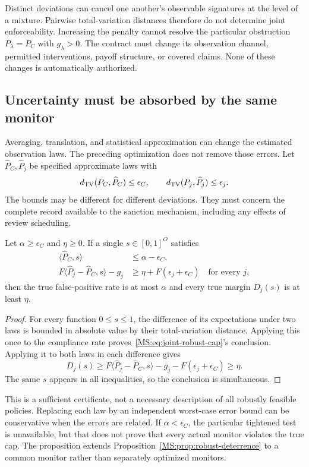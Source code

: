 Distinct deviations can cancel one another's observable signatures at the level of a mixture. Pairwise total-variation distances therefore do not determine joint enforceability. Increasing the penalty cannot resolve the particular obstruction $P_\lambda=P_C$ with $g_\lambda>0$. The contract must change its observation channel, permitted interventions, payoff structure, or covered claims. None of these changes is automatically authorized.

\subsection{Uncertainty must be absorbed by the same monitor}
Averaging, translation, and statistical approximation can change the estimated observation laws. The preceding optimization does not remove those errors. Let $\widehat P_C,\widehat P_j$ be specified approximate laws with
\[
d_{\mathrm{TV}}(P_C,\widehat P_C)\leq\epsilon_C,
\qquad
d_{\mathrm{TV}}(P_j,\widehat P_j)\leq\epsilon_j.
\]
The bounds may be different for different deviations. They must concern the complete record available to the sanction mechanism, including any effects of review scheduling.

\begin{MSproposition}\label{MS:prop:joint-robust}
Let $\alpha\geq\epsilon_C$ and $\eta\geq0$. If a single $s\in[0,1]^O$ satisfies
\begin{align}
\langle\widehat P_C,s\rangle&\leq\alpha-\epsilon_C,\label{MS:eq:joint-robust-cap}\\
F\langle\widehat P_j-\widehat P_C,s\rangle-g_j
&\geq\eta+F(\epsilon_j+\epsilon_C)
\quad\text{for every }j,\label{MS:eq:joint-robust-gap}
\end{align}
then the true false-positive rate is at most $\alpha$ and every true margin $D_j(s)$ is at least $\eta$.
\end{MSproposition}
\begin{proof}
For every function $0\leq s\leq1$, the difference of its expectations under two laws is bounded in absolute value by their total-variation distance. Applying this once to the compliance rate proves~\eqref{MS:eq:joint-robust-cap}'s conclusion. Applying it to both laws in each difference gives
\[
D_j(s)\geq F\langle\widehat P_j-\widehat P_C,s\rangle-g_j
-F(\epsilon_j+\epsilon_C)\geq\eta.
\]
The same $s$ appears in all inequalities, so the conclusion is simultaneous.
\end{proof}

This is a sufficient certificate, not a necessary description of all robustly feasible policies. Replacing each law by an independent worst-case error bound can be conservative when the errors are related. If $\alpha<\epsilon_C$, the particular tightened test is unavailable, but that does not prove that every actual monitor violates the true cap. The proposition extends Proposition~\ref{MS:prop:robust-deterrence} to a common monitor rather than separately optimized monitors.

